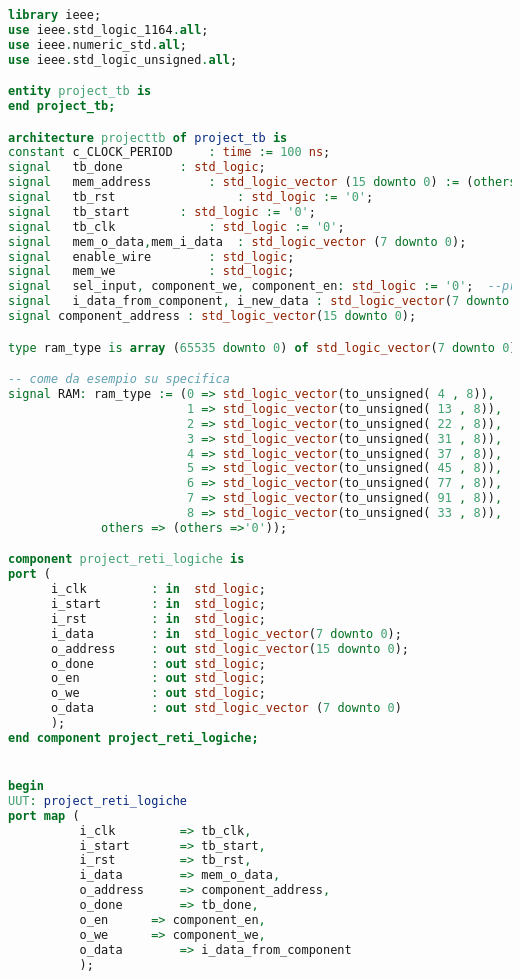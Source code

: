 \documentclass [a4paper, 12pt]{article}
\begin{document}
\begin{lstlisting}[language=VHDL, caption=tb\_pfrl\_2020\_repeated.vhd, basicstyle=\tiny, breaklines]
library ieee;
use ieee.std_logic_1164.all;
use ieee.numeric_std.all;
use ieee.std_logic_unsigned.all;

entity project_tb is
end project_tb;

architecture projecttb of project_tb is
constant c_CLOCK_PERIOD		: time := 100 ns;
signal   tb_done		: std_logic;
signal   mem_address		: std_logic_vector (15 downto 0) := (others => '0');
signal   tb_rst	                : std_logic := '0';
signal   tb_start		: std_logic := '0';
signal   tb_clk		        : std_logic := '0';
signal   mem_o_data,mem_i_data	: std_logic_vector (7 downto 0);
signal   enable_wire  		: std_logic;
signal   mem_we		        : std_logic;
signal   sel_input, component_we, component_en: std_logic := '0';  --propri
signal   i_data_from_component, i_new_data : std_logic_vector(7 downto 0);
signal component_address : std_logic_vector(15 downto 0);

type ram_type is array (65535 downto 0) of std_logic_vector(7 downto 0);

-- come da esempio su specifica
signal RAM: ram_type := (0 => std_logic_vector(to_unsigned( 4 , 8)),
                         1 => std_logic_vector(to_unsigned( 13 , 8)),
                         2 => std_logic_vector(to_unsigned( 22 , 8)),
                         3 => std_logic_vector(to_unsigned( 31 , 8)),
                         4 => std_logic_vector(to_unsigned( 37 , 8)),
                         5 => std_logic_vector(to_unsigned( 45 , 8)),
                         6 => std_logic_vector(to_unsigned( 77 , 8)),
                         7 => std_logic_vector(to_unsigned( 91 , 8)),
                         8 => std_logic_vector(to_unsigned( 33 , 8)),
			 others => (others =>'0'));

component project_reti_logiche is
port (
      i_clk         : in  std_logic;
      i_start       : in  std_logic;
      i_rst         : in  std_logic;
      i_data        : in  std_logic_vector(7 downto 0);
      o_address     : out std_logic_vector(15 downto 0);
      o_done        : out std_logic;
      o_en          : out std_logic;
      o_we          : out std_logic;
      o_data        : out std_logic_vector (7 downto 0)
      );
end component project_reti_logiche;


begin
UUT: project_reti_logiche
port map (
          i_clk      	=> tb_clk,
          i_start       => tb_start,
          i_rst      	=> tb_rst,
          i_data    	=> mem_o_data,
          o_address  	=> component_address,
          o_done      	=> tb_done,
          o_en   	=> component_en,
          o_we 		=> component_we,
          o_data    	=> i_data_from_component
          );


\end{lstlisting}
\end{document}

